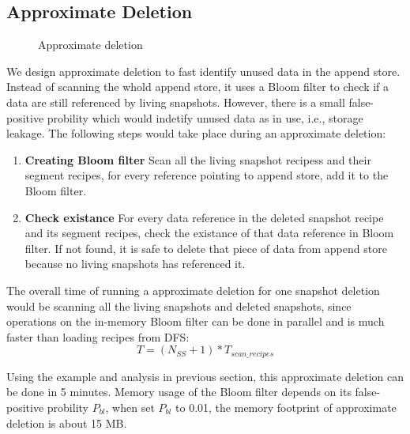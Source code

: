 \subsection{Approximate Deletion}
\begin{figure}[htbp]
  \centering
  \caption{Approximate deletion}
  \label{fig:deletion_flow}
\end{figure}

We design approximate deletion to fast identify unused data in the append store.
Instead of scanning the whold append store, it uses a Bloom filter to check 
if a data are still referenced by living snapshots. However, there is a small false-positive probility which
would indetify unused data as in use, i.e., storage leakage.
The following steps would take place during an approximate deletion:

\begin{enumerate}
\item {\bf Creating Bloom filter} Scan all the living snapshot recipess and their segment recipes,
for every reference pointing to append store, add it to the Bloom filter.
\item {\bf Check existance} For every data reference in the deleted snapshot recipe and its segment recipes,
check the existance of that data reference in Bloom filter. If not found, it is safe to delete that piece of data from append store
because no living snapshots has referenced it.
\end{enumerate}

The overall time of running a approximate deletion for one snapshot deletion would be scanning
all the living snapshots and deleted snapshots, since operations on the in-memory Bloom filter can be done in
parallel and is much faster than loading recipes from DFS:
\begin{equation}
T = (N_{SS} + 1) * T_{scan\_recipes}
\end{equation}
 
Using the example and analysis in previous section, this approximate deletion can be done in 5 minutes. 
Memory usage of the Bloom filter depends on its false-positive probility $P_{bl}$,
when set $P_{bl}$ to 0.01, the memory footprint of approximate deletion is about 15 MB.

